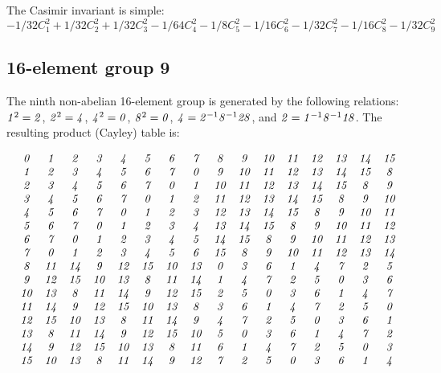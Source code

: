 \documentclass[12pt]{article}
\begin{document}
The Casimir invariant is simple:
$$
-1/32 C_1^2 + 1/32 C_2^2 + 1/32 C_3^2 -1/64 C_4^2 - 1/8 C_5^2 -1/16 C_6^2
-1/32 C_7^2 - 1/16 C_8^2 - 1/32 C_9^2
$$


\subsection{16-element group 9}
 The ninth non-abelian 16-element group is generated by the following
relations: $\G1^2=\G2$, $\G2^2=\G4$, $\G4^2=\G0$, $\G8^2=\G0$,
$\G4=\G2^{-1}\G8^{-1}\G2\G8$, and $\G2=\G1^{-1}\G8^{-1}\G1\G8$.  The
resulting product (Cayley) table is:

\begin{displaymath}
\begin{array}{cccccccccccccccc}
\G0& \G1& \G2& \G3& \G4& \G5& \G6& \G7& \G8& \G9& \G1\G0& \G1\G1& \G1\G2& \G1\G3& \G1\G4& \G1\G5 \\
\G1& \G2& \G3& \G4& \G5& \G6& \G7& \G0& \G9& \G1\G0& \G1\G1& \G1\G2& \G1\G3& \G1\G4& \G1\G5& \G8 \\
\G2& \G3& \G4& \G5& \G6& \G7& \G0& \G1& \G1\G0& \G1\G1& \G1\G2& \G1\G3& \G1\G4& \G1\G5& \G8& \G9 \\
\G3& \G4& \G5& \G6& \G7& \G0& \G1& \G2& \G1\G1& \G1\G2& \G1\G3& \G1\G4& \G1\G5& \G8& \G9& \G1\G0 \\
\G4& \G5& \G6& \G7& \G0& \G1& \G2& \G3& \G1\G2& \G1\G3& \G1\G4& \G1\G5& \G8& \G9& \G1\G0& \G1\G1 \\
\G5& \G6& \G7& \G0& \G1& \G2& \G3& \G4& \G1\G3& \G1\G4& \G1\G5& \G8& \G9& \G1\G0& \G1\G1& \G1\G2 \\
\G6& \G7& \G0& \G1& \G2& \G3& \G4& \G5& \G1\G4& \G1\G5& \G8& \G9& \G1\G0& \G1\G1& \G1\G2& \G1\G3 \\
\G7& \G0& \G1& \G2& \G3& \G4& \G5& \G6& \G1\G5& \G8& \G9& \G1\G0& \G1\G1& \G1\G2& \G1\G3& \G1\G4 \\
\G8& \G1\G1& \G1\G4& \G9& \G1\G2& \G1\G5& \G1\G0& \G1\G3& \G0& \G3& \G6& \G1& \G4& \G7& \G2& \G5 \\
\G9& \G1\G2& \G1\G5& \G1\G0& \G1\G3& \G8& \G1\G1& \G1\G4& \G1& \G4& \G7& \G2& \G5& \G0& \G3& \G6 \\
\G1\G0& \G1\G3& \G8& \G1\G1& \G1\G4& \G9& \G1\G2& \G1\G5& \G2& \G5& \G0& \G3& \G6& \G1& \G4& \G7 \\
\G1\G1& \G1\G4& \G9& \G1\G2& \G1\G5& \G1\G0& \G1\G3& \G8& \G3& \G6& \G1& \G4& \G7& \G2& \G5& \G0 \\
\G1\G2& \G1\G5& \G1\G0& \G1\G3& \G8& \G1\G1& \G1\G4& \G9& \G4& \G7& \G2& \G5& \G0& \G3& \G6& \G1 \\
\G1\G3& \G8& \G1\G1& \G1\G4& \G9& \G1\G2& \G1\G5& \G1\G0& \G5& \G0& \G3& \G6& \G1& \G4& \G7& \G2 \\ 
\G1\G4& \G9& \G1\G2& \G1\G5& \G1\G0& \G1\G3& \G8& \G1\G1& \G6& \G1& \G4& \G7& \G2& \G5& \G0& \G3 \\
\G1\G5& \G1\G0& \G1\G3& \G8& \G1\G1& \G1\G4& \G9& \G1\G2& \G7& \G2& \G5& \G0& \G3& \G6& \G1& \G4
\end{array}
\end{displaymath}
\end{document}
